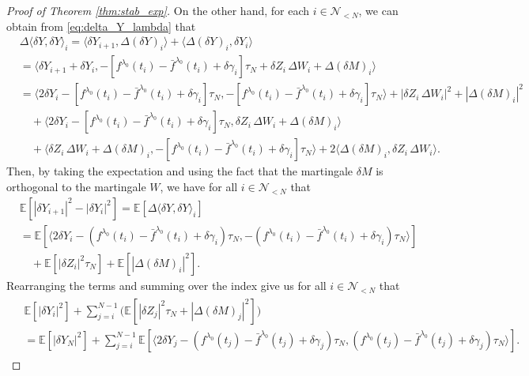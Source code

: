 \documentclass[11pt]{article}
\numberwithin{equation}{section}
\theoremstyle{definition}
\theoremstyle{remark}
\def\l{\label}  \def\f{\frac}  \def\fa{\forall}
\def \la{\langle} \def\ra{\rangle}
\def\cN{\mathcal{N}}
\def\sE{{\mathbb{E}}}
\begin{document}
\begin{proof}[Proof of Theorem \ref{thm:stab_exp}]
On the other hand, 
for each $i\in \cN_{<N}$, 
we can obtain from   \eqref{eq:delta_Y_lambda}
that
\begin{align*}
&\Delta \la \delta Y,\delta Y \ra_i
= \la \delta Y_{i+1},\Delta (\delta Y)_i \ra+  \la \Delta (\delta Y)_i , \delta Y_{i}\ra
\\
&=
 \la \delta Y_{i+1}+\delta Y_{i}, -[f^{\lambda_0}(t_{i})-\bar{f}^{\lambda_0}(t_{i})+\delta \gamma_i]\tau_N+\delta  {Z}_i\,\Delta W_i+\Delta (\delta {M})_i\ra
 \\
 &= \la 2\delta Y_{i}-[f^{\lambda_0}(t_{i})-\bar{f}^{\lambda_0}(t_{i})+\delta \gamma_i]\tau_N, -[f^{\lambda_0}(t_{i})-\bar{f}^{\lambda_0}(t_{i})+\delta \gamma_i]\tau_N \ra
 +|  \delta  {Z}_i\,\Delta W_i|^2
+|\Delta (\delta {M})_i|^2
\\
&\quad +
\la 2\delta Y_{i}-[f^{\lambda_0}(t_{i})-\bar{f}^{\lambda_0}(t_{i})+\delta \gamma_i]\tau_N, \delta  {Z}_i\,\Delta W_i+\Delta (\delta {M})_i \ra
\\
&\quad
+
\la \delta  {Z}_i\,\Delta W_i+\Delta (\delta {M})_i, -[f^{\lambda_0}(t_{i})-\bar{f}^{\lambda_0}(t_{i})+\delta \gamma_i]\tau_N \ra
+2\la \Delta (\delta {M})_i,\delta  {Z}_i\,\Delta W_i\ra. 
\end{align*}
Then, by taking the expectation and using the fact that the martingale $\delta M$  is orthogonal to the martingale $W$, we have for all $i\in \cN_{<N}$ that
\begin{align*}
&\sE[|\delta Y_{i+1}|^2-|\delta Y_{i}|^2]=\sE[\Delta \la \delta Y,\delta Y \ra_i]
\\
&= 
\sE[   \la 2\delta Y_{i}-(f^{\lambda_0}(t_{i})-\bar{f}^{\lambda_0}(t_{i})+\delta \gamma_i)\tau_N, -(f^{\lambda_0}(t_{i})-\bar{f}^{\lambda_0}(t_{i})+\delta \gamma_i)\tau_N \ra
]
\\
&\quad
 +\sE[| \delta {Z}_i|^2\tau_N]+\sE[|\Delta  (\delta {M})_i |^2].
\end{align*}
Rearranging the terms and summing over the index give us 
for all $i\in \cN_{<N}$ that 
\begin{align}\l{eq:delta Y_i_estimate}
\begin{split}
&\sE[|\delta Y_{i}|^2]+\sum_{j=i}^{N-1}\big(\sE[| \delta {Z}_j|^2\tau_N+|\Delta  (\delta {M})_j|^2]\big)
\\
&=
\sE[|\delta Y_{N}|^2]
+\sum_{j=i}^{N-1} 
 \sE[    \la 2\delta Y_{j}-(f^{\lambda_0}(t_{j})-\bar{f}^{\lambda_0}(t_{j})+\delta \gamma_j)\tau_N, (f^{\lambda_0}(t_{j})-\bar{f}^{\lambda_0}(t_{j})+\delta \gamma_j)\tau_N \ra ].
 \end{split}
\end{align}

\end{proof}
\end{document}
